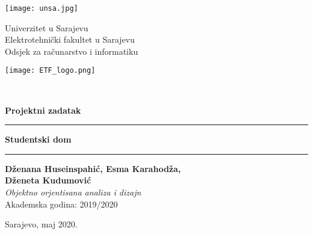 \documentclass{article}
\begin{document}
	\begin{titlepage}
		\newcommand{\HRule}{\rule{\linewidth}{1mm}} 
		\noindent
		{\large
		\begin{minipage}{0.2\textwidth}
				\begin{center} 
					\texttt{[image: unsa.jpg]}
				\end{center}
			\end{minipage}
			\begin{minipage}{0.58\textwidth}
				\begin{center} \large
					Univerzitet u Sarajevu\\
					Elektrotehnički fakultet u Sarajevu\\
					Odsjek za računarstvo i informatiku\\
				\end{center}
			\end{minipage}
			\begin{minipage}{0.2\textwidth}
				\begin{center} 
					\texttt{[image: ETF\_logo.png]}
				\end{center}
			\end{minipage}
			\\[6 cm] 
			\begin{minipage}{0.2\textwidth}
				\begin{center} 
					
				\end{center}
			\end{minipage}
		
			
			


\begin{center}
	\vspace{0.1cm}
	\Large \textbf{Projektni zadatak}
	\vspace{0.1cm}
\end{center}

\rule{\textwidth}{0.1mm}

\begin{center}
	\vspace{0.1cm}
	\LARGE \textbf{Studentski dom}
	\vspace{0.3cm}
\end{center}

\rule{\textwidth}{0.1mm}

\begin{center}
    \textbf{Dženana Huseinspahić, Esma Karahodža, \\Dženeta Kudumović}\\
   \textit{Objektno orjentisana analiza i dizajn}\\
    Akademska godina: 2019/2020\\
    \vspace{0.5cm}
\end{center}




\vfill
\begin{center}
	Sarajevo, maj 2020.
\end{center}	 		
		}
	\end{titlepage}
\end{document}
